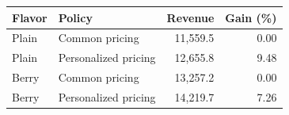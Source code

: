 \begin{tabular}{llrr}\toprule
Flavor & Policy & Revenue & Gain (\%)\\\midrule
Plain & Common pricing & 11,559.5 & 0.00\\
Plain & Personalized pricing & 12,655.8 & 9.48\\
Berry & Common pricing & 13,257.2 & 0.00\\
Berry & Personalized pricing & 14,219.7 & 7.26\\
\bottomrule\end{tabular}
